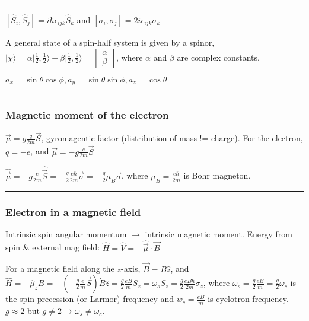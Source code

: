 \hrule height 0.05pt

$[\widehat{S}_i, \widehat{S}_j] = i \hbar \epsilon_{ijk} \widehat{S}_k$ and $[\sigma_i, \sigma_j] = 2 i \epsilon_{ijk} \sigma_k$

A general state of a spin-half system is given by a spinor, $|\chi \rangle = \alpha | \frac{1}{2}, \frac{1}{2} \rangle + \beta | \frac{1}{2}, \frac{1}{2} \rangle = \begin{bmatrix} \alpha \\ \beta \end{bmatrix}$, where $\alpha$ and $\beta$ are complex constants.

$a_x = \sin \theta \cos \phi, a_y = \sin \theta \sin \phi, a_z = \cos \theta$


\hrule height 0.05pt

\subsubsection{Magnetic moment of the electron}
$\vec{\mu} = g \frac{q}{2m} \vec{S}$, gyromagentic factor (distribution of mass != charge).
For the electron, $q=-e$, and $\vec{\mu} = -g \frac{e}{2m} \vec{S}$

$\widehat{\vec{\mu}} = -g \frac{e}{2m} \widehat{\vec{S}} = -\frac{g}{2} \frac{e \hbar}{2m} \vec{\sigma} = - \frac{g}{2} \mu_B \vec{\sigma}$, where $\mu_B = \frac{e \hbar}{2m}$ is Bohr magneton.

\hrule height 0.05pt

\subsubsection{Electron in a magnetic field}

Intrinsic spin angular momentum $\rightarrow$ intrinsic magnetic moment. Energy from spin \& external mag field: $\widehat{H} = \widehat{V} = -\widehat{\vec{\mu}} \cdot \vec{B}$

For a magnetic field along the $z$-axis, $\vec{B} = B \widehat{z}$, and $\widehat{H} = -\widehat{\mu}_z B = -(-\frac{g}{2} \frac{e}{m} \vec{S}) \dot B \widehat{z} = \frac{g}{2} \frac{eB}{m} S_z = \omega_s S_z = \frac{g}{2} \frac{eB\hbar}{2m} \sigma_z$, where $\omega_s = \frac{g}{2} \frac{eB}{m} = \frac{g}{2} \omega_c$ is the spin precession (or Larmor) frequency and $w_c = \frac{e B}{m}$ is cyclotron frequency. $g \approx 2$ but $g \neq 2 \rightarrow \omega_s \neq \omega_c$.

